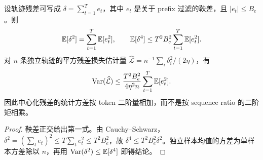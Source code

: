 \begin{proposition}
\label{prop:bpo-loss-variance}
设轨迹残差可写成 $\delta=\sum_{t=1}^{T}e_t$，其中 $e_t$ 是关于 prefix 过滤的鞅差，且 $|e_t|\leq B_e$。则
\begin{equation}
\mathbb{E}[\delta^2]=\sum_{t=1}^{T}\mathbb{E}[e_t^2],
\qquad
\mathbb{E}[\delta^4]\leq T^2B_e^2\sum_{t=1}^{T}\mathbb{E}[e_t^2].
\end{equation}
对 $n$ 条独立轨迹的平方残差损失估计量
$\widehat{\mathcal L}=n^{-1}\sum_i\delta_i^2/(2\eta)$，有
\begin{equation}
\operatorname{Var}(\widehat{\mathcal L})
\leq \frac{T^2B_e^2}{4\eta^2n}
\sum_{t=1}^{T}\mathbb{E}[e_t^2].
\end{equation}
因此中心化残差的统计方差按 token 二阶量相加，而不是按 sequence ratio 的二阶矩相乘。
\end{proposition}

\begin{proof}
鞅差正交给出第一式。由 Cauchy--Schwarz，
$\delta^2=(\sum_te_t)^2\leq T\sum_te_t^2\leq T^2B_e^2$，故
$\delta^4\leq T^2B_e^2\delta^2$。独立样本均值的方差为单样本方差除以 $n$，再用
$\operatorname{Var}(\delta^2)\leq\mathbb{E}[\delta^4]$ 即得结论。
\end{proof}
